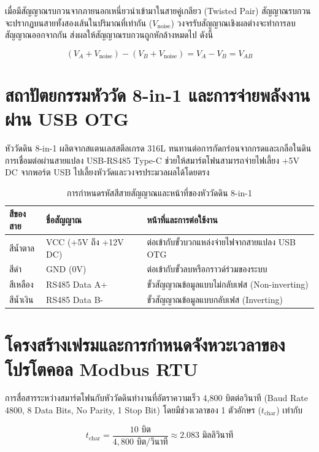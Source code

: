 เมื่อมีสัญญาณรบกวนจากภายนอกเหนี่ยวนำเข้ามาในสายคู่เกลียว (Twisted Pair) สัญญาณรบกวนจะปรากฏบนสายทั้งสองเส้นในปริมาณที่เท่ากัน ($V_{\text{noise}}$) วงจรรับสัญญาณเชิงผลต่างจะทำการลบสัญญาณออกจากกัน ส่งผลให้สัญญาณรบกวนถูกหักล้างหมดไป ดังนี้

\begin{equation}
(V_A + V_{\text{noise}}) - (V_B + V_{\text{noise}}) = V_A - V_B = V_{AB}
\end{equation}

\section{สถาปัตยกรรมหัววัด 8-in-1 และการจ่ายพลังงานผ่าน USB OTG}

หัววัดดิน 8-in-1 ผลิตจากสแตนเลสสตีลเกรด 316L ทนทานต่อการกัดกร่อนจากกรดและเกลือในดิน การเชื่อมต่อผ่านสายแปลง USB-RS485 Type-C ช่วยให้สมาร์ตโฟนสามารถจ่ายไฟเลี้ยง +5V DC จากพอร์ต USB ไปเลี้ยงหัววัดและวงจรประมวลผลได้โดยตรง

\begin{table}[H]
\centering
\caption{การกำหนดรหัสสีสายสัญญาณและหน้าที่ของหัววัดดิน 8-in-1}
\label{tab:wire_pinout}
\begin{tabularx}{\textwidth}{p{2.5cm}p{3.5cm}Y}
    \toprule
    \textbf{สีของสาย} & \textbf{ชื่อสัญญาณ} & \textbf{หน้าที่และการต่อใช้งาน} \\
    \midrule
    สีน้ำตาล & VCC (+5V ถึง +12V DC) & ต่อเข้ากับขั้วบวกแหล่งจ่ายไฟจากสายแปลง USB OTG \\
    สีดำ & GND (0V) & ต่อเข้ากับขั้วลบหรือกราวด์ร่วมของระบบ \\
    สีเหลือง & RS485 Data A+ & ขั้วสัญญาณข้อมูลแบบไม่กลับเฟส (Non-inverting) \\
    สีน้ำเงิน & RS485 Data B- & ขั้วสัญญาณข้อมูลแบบกลับเฟส (Inverting) \\
    \bottomrule
\end{tabularx}
\end{table}

\section{โครงสร้างเฟรมและการกำหนดจังหวะเวลาของโปรโตคอล Modbus RTU}

การสื่อสารระหว่างสมาร์ตโฟนกับหัววัดดินทำงานที่อัตราความเร็ว 4,800 บิตต่อวินาที (Baud Rate 4800, 8 Data Bits, No Parity, 1 Stop Bit) โดยมีช่วงเวลาของ 1 ตัวอักษร ($t_{\text{char}}$) เท่ากับ

\begin{equation}
t_{\text{char}} = \frac{10 \text{ บิต}}{4,800 \text{ บิต/วินาที}} \approx 2.083 \text{ มิลลิวินาที}
\end{equation}

